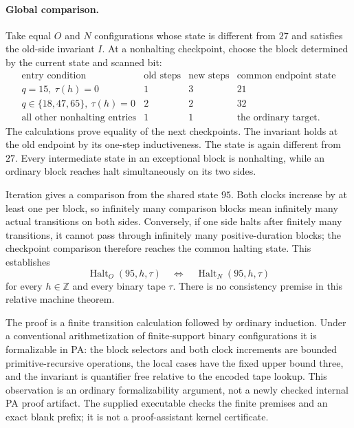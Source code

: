\paragraph{Global comparison.}
Take equal $O$ and $N$ configurations whose state is different from $27$
and satisfies the old-side invariant $I$. At a nonhalting checkpoint,
choose the block determined by the current state and scanned bit:
\[
\begin{array}{c|c|c|c}
\text{entry condition}&\text{old steps}&\text{new steps}
 &\text{common endpoint state}\\\hline
q=15,\ \tau(h)=0&1&3&21\\
q\in\{18,47,65\},\ \tau(h)=0&2&2&32\\
\text{all other nonhalting entries}&1&1&\text{the ordinary target}.
\end{array}
\]
The calculations prove equality of the next checkpoints. The invariant
holds at the old endpoint by its one-step inductiveness. The state is
again different from $27$. Every intermediate state in an exceptional
block is nonhalting, while an ordinary block reaches halt simultaneously
on its two sides.

Iteration gives a comparison from the shared state $95$. Both clocks
increase by at least one per block, so infinitely many comparison blocks
mean infinitely many actual transitions on both sides. Conversely, if
one side halts after finitely many transitions, it cannot pass through
infinitely many positive-duration blocks; the checkpoint comparison
therefore reaches the common halting state. This establishes
\[
 \operatorname{Halt}_O(95,h,\tau)
 \quad\Longleftrightarrow\quad
 \operatorname{Halt}_N(95,h,\tau)
\]
for every $h\in\mathbb Z$ and every binary tape $\tau$.
There is no consistency premise in this relative machine theorem.

The proof is a finite transition calculation followed by ordinary
induction. Under a conventional arithmetization of finite-support binary
configurations it is formalizable in PA: the block selectors and both
clock increments are bounded primitive-recursive operations, the local
cases have the fixed upper bound three, and the invariant is quantifier
free relative to the encoded tape lookup. This observation is an ordinary
formalizability argument, not a newly checked internal PA proof artifact.
The supplied executable checks the finite premises and an exact blank
prefix; it is not a proof-assistant kernel certificate.

